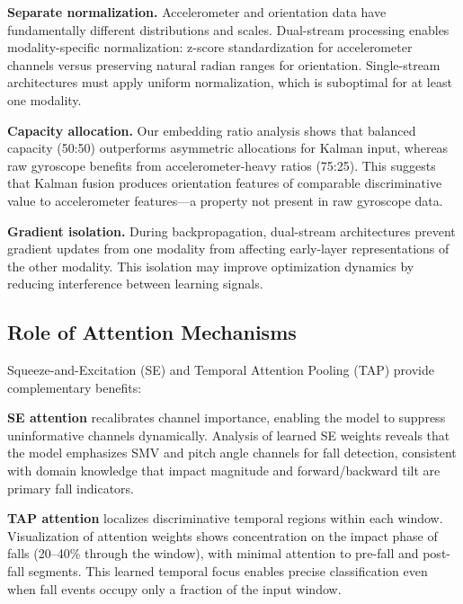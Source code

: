 \textbf{Separate normalization.} Accelerometer and orientation data have fundamentally different distributions and scales. Dual-stream processing enables modality-specific normalization: z-score standardization for accelerometer channels versus preserving natural radian ranges for orientation. Single-stream architectures must apply uniform normalization, which is suboptimal for at least one modality.

\textbf{Capacity allocation.} Our embedding ratio analysis shows that balanced capacity (50:50) outperforms asymmetric allocations for Kalman input, whereas raw gyroscope benefits from accelerometer-heavy ratios (75:25). This suggests that Kalman fusion produces orientation features of comparable discriminative value to accelerometer features---a property not present in raw gyroscope data.

\textbf{Gradient isolation.} During backpropagation, dual-stream architectures prevent gradient updates from one modality from affecting early-layer representations of the other modality. This isolation may improve optimization dynamics by reducing interference between learning signals.

\subsection{Role of Attention Mechanisms}
\label{subsec:attention_roles}

Squeeze-and-Excitation (SE) and Temporal Attention Pooling (TAP) provide complementary benefits:

\textbf{SE attention} recalibrates channel importance, enabling the model to suppress uninformative channels dynamically. Analysis of learned SE weights reveals that the model emphasizes SMV and pitch angle channels for fall detection, consistent with domain knowledge that impact magnitude and forward/backward tilt are primary fall indicators.

\textbf{TAP attention} localizes discriminative temporal regions within each window. Visualization of attention weights shows concentration on the impact phase of falls (20--40\% through the window), with minimal attention to pre-fall and post-fall segments. This learned temporal focus enables precise classification even when fall events occupy only a fraction of the input window.

